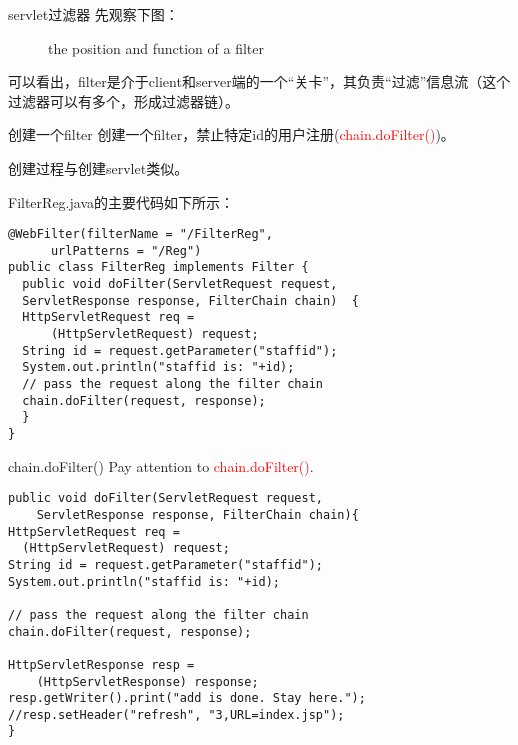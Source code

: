 \documentclass{beamer}
\begin{document}
\begin{frame}{servlet过滤器}
先观察下图：
\begin{figure}
\caption{the position and function of a filter}
\end{figure}
可以看出，filter是介于client和server端的一个“关卡”，其负责“过滤”信息流（这个过滤器可以有多个，形成过滤器链）。
\end{frame}
\begin{frame}[fragile]{创建一个filter}
创建一个filter，禁止特定id的用户注册(\textcolor{red}{chain.doFilter()})。

创建过程与创建servlet类似。

FilterReg.java的主要代码如下所示：
\begin{lstlisting}
@WebFilter(filterName = "/FilterReg",
      urlPatterns = "/Reg")
public class FilterReg implements Filter {
  public void doFilter(ServletRequest request, 
  ServletResponse response, FilterChain chain)  {
  HttpServletRequest req = 
      (HttpServletRequest) request; 
  String id = request.getParameter("staffid");
  System.out.println("staffid is: "+id);
  // pass the request along the filter chain
  chain.doFilter(request, response);
  }
}
\end{lstlisting}
\end{frame}
\begin{frame}[fragile]{chain.doFilter()}
Pay attention to 
\textcolor{red}{chain.doFilter()}.
\begin{lstlisting}
public void doFilter(ServletRequest request, 
    ServletResponse response, FilterChain chain){
HttpServletRequest req = 
  (HttpServletRequest) request; 
String id = request.getParameter("staffid");
System.out.println("staffid is: "+id);
	
// pass the request along the filter chain
chain.doFilter(request, response);
		
HttpServletResponse resp = 
    (HttpServletResponse) response;
resp.getWriter().print("add is done. Stay here.");
//resp.setHeader("refresh", "3,URL=index.jsp");
}
\end{lstlisting}
\end{frame}
\end{document}
